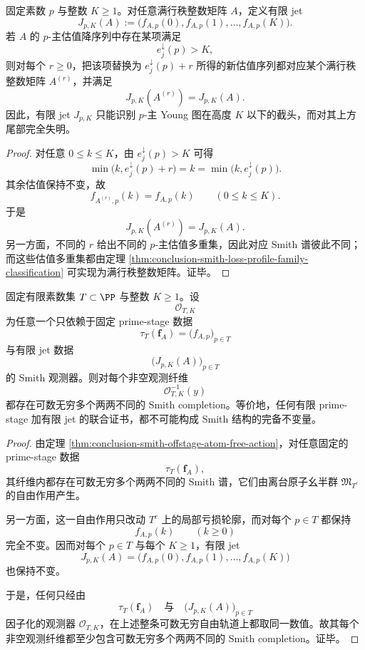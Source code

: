 \begin{proposition}\label{prop:conclusion-smith-finite-jet-sees-only-truncated-young-diagram}
固定素数 \(p\) 与整数 \(K\ge 1\)。对任意满行秩整数矩阵 \(A\)，定义有限 jet
\[
J_{p,K}(A):=\bigl(f_{A,p}(0),f_{A,p}(1),\dots,f_{A,p}(K)\bigr).
\]
若 \(A\) 的 \(p\)-主估值降序列中存在某项满足
\[
e_j^\downarrow(p)>K,
\]
则对每个 \(r\ge 0\)，把该项替换为 \(e_j^\downarrow(p)+r\) 所得的新估值序列都对应某个满行秩整数矩阵 \(A^{(r)}\)，并满足
\[
J_{p,K}(A^{(r)})=J_{p,K}(A).
\]
因此，有限 jet \(J_{p,K}\) 只能识别 \(p\)-主 Young 图在高度 \(K\) 以下的截头，而对其上方尾部完全失明。
\end{proposition}
\begin{proof}
对任意 \(0\le k\le K\)，由 \(e_j^\downarrow(p)>K\) 可得
\[
\min\bigl(k,e_j^\downarrow(p)+r\bigr)=k=\min\bigl(k,e_j^\downarrow(p)\bigr).
\]
其余估值保持不变，故
\[
f_{A^{(r)},p}(k)=f_{A,p}(k)
\qquad(0\le k\le K).
\]
于是
\[
J_{p,K}(A^{(r)})=J_{p,K}(A).
\]
另一方面，不同的 \(r\) 给出不同的 \(p\)-主估值多重集，因此对应 Smith 谱彼此不同；而这些估值多重集都由定理 \ref{thm:conclusion-smith-loss-profile-family-classification} 可实现为满行秩整数矩阵。证毕。
\end{proof}

\begin{theorem}\label{thm:conclusion-smith-finite-stage-finite-jet-joint-fiber-countably-infinite}
固定有限素数集 \(T\subset\PP\) 与整数 \(K\ge 1\)。设
\[
\mathcal O_{T,K}
\]
为任意一个只依赖于固定 prime-stage 数据
\[
\tau_T(\mathbf f_A)=\bigl(f_{A,p}\bigr)_{p\in T}
\]
与有限 jet 数据
\[
\bigl(J_{p,K}(A)\bigr)_{p\in T}
\]
的 Smith 观测器。则对每个非空观测纤维
\[
\mathcal O_{T,K}^{-1}(y)
\]
都存在可数无穷多个两两不同的 Smith completion。等价地，任何有限 prime-stage 加有限 jet 的联合证书，都不可能构成 Smith 结构的完备不变量。
\end{theorem}
\begin{proof}
由定理 \ref{thm:conclusion-smith-offstage-atom-free-action}，对任意固定的 prime-stage 数据
\[
\tau_T(\mathbf f_A),
\]
其纤维内都存在可数无穷多个两两不同的 Smith 谱，它们由离台原子幺半群 \(\mathfrak M_{T^c}\) 的自由作用产生。

另一方面，这一自由作用只改动 \(T^c\) 上的局部亏损轮廓，而对每个 \(p\in T\) 都保持
\[
f_{A,p}(k)
\qquad (k\ge 0)
\]
完全不变。因而对每个 \(p\in T\) 与每个 \(K\ge 1\)，有限 jet
\[
J_{p,K}(A)=\bigl(f_{A,p}(0),f_{A,p}(1),\dots,f_{A,p}(K)\bigr)
\]
也保持不变。

于是，任何只经由
\[
\tau_T(\mathbf f_A)
\quad\text{与}\quad
\bigl(J_{p,K}(A)\bigr)_{p\in T}
\]
因子化的观测器 \(\mathcal O_{T,K}\)，在上述整条可数无穷自由轨道上都取同一数值。故其每个非空观测纤维都至少包含可数无穷多个两两不同的 Smith completion。证毕。
\end{proof}

